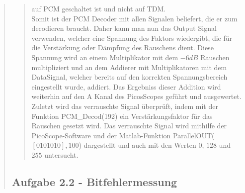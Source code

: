 \begin{quote}
\begin{quote}
        auf PCM geschaltet ist und nicht auf TDM.\\
        Somit ist der PCM Decoder mit allen Signalen beliefert, die er zum
        decodieren braucht. Daher kann man nun das Output Signal verwenden,
        welcher eine Spannung des Faktors wiedergibt, die für die
        Verstärkung oder Dämpfung des Rauschens dient. Diese Spannung wird an
        einem Multiplikator mit dem $-6 dB$ Rauschen multipliziert und an dem
        Addierer mit Multiplikatoren mit dem DataSignal, welcher bereits auf den korrekten Spannungsbereich
        eingestellt wurde, addiert. Das Ergebniss dieser Addition wird weiterhin
        auf den A Kanal des PicosScopes geführt und ausgewertet.\\
        
        Zuletzt wird das verrauschte Signal überprüft, indem mit der Funktion
        PCM\_Decod(192) ein Verstärkungsfaktor für das Rauschen gesetzt wird.
        Das verrauschte Signal wird mithilfe der PicoScope-Software und der
        Matlab-Funktion ParallelOUT($[0 1 0 1 0 1 0],100$) dargestellt und auch
        mit den Werten $0$, $128$ und $255$ untersucht.
        
        
    \end{quote}%
    
    \subsection{Aufgabe 2.2 - Bitfehlermessung}
    \begin{quote}
    
    
    \end{quote}%

\end{quote}%


    
